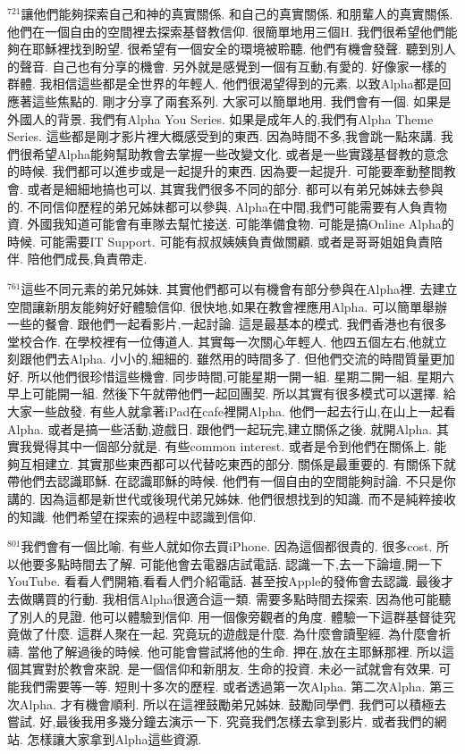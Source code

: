 \documentclass{book}
\begin{document}
$^{721}$讓他們能夠探索自己和神的真實關係.
和自己的真實關係.
和朋輩人的真實關係.
他們在一個自由的空間裡去探索基督教信仰.
很簡單地用三個H.
我們很希望他們能夠在耶穌裡找到盼望.
很希望有一個安全的環境被聆聽.
他們有機會發聲.
聽到別人的聲音.
自己也有分享的機會.
另外就是感覺到一個有互動,有愛的.
好像家一樣的群體.
我相信這些都是全世界的年輕人.
他們很渴望得到的元素.
以致Alpha都是回應著這些焦點的.
剛才分享了兩套系列.
大家可以簡單地用.
我們會有一個.
如果是外國人的背景.
我們有Alpha You Series.
如果是成年人的,我們有Alpha Theme Series.
這些都是剛才影片裡大概感受到的東西.
因為時間不多,我會跳一點來講.
我們很希望Alpha能夠幫助教會去掌握一些改變文化.
或者是一些實踐基督教的意念的時候.
我們都可以進步或是一起提升的東西.
因為要一起提升.
可能要牽動整間教會.
或者是細細地搞也可以.
其實我們很多不同的部分.
都可以有弟兄姊妹去參與的.
不同信仰歷程的弟兄姊妹都可以參與.
Alpha在中間,我們可能需要有人負責物資.
外國我知道可能會有車隊去幫忙接送.
可能準備食物.
可能是搞Online Alpha的時候.
可能需要IT Support.
可能有叔叔姨姨負責做關顧.
或者是哥哥姐姐負責陪伴.
陪他們成長,負責帶走.

$^{761}$這些不同元素的弟兄姊妹.
其實他們都可以有機會有部分參與在Alpha裡.
去建立空間讓新朋友能夠好好體驗信仰.
很快地,如果在教會裡應用Alpha.
可以簡單舉辦一些的餐會.
跟他們一起看影片,一起討論.
這是最基本的模式.
我們香港也有很多堂校合作.
在學校裡有一位傳道人.
其實每一次關心年輕人.
他四五個左右,他就立刻跟他們去Alpha.
小小的,細細的.
雖然用的時間多了.
但他們交流的時間質量更加好.
所以他們很珍惜這些機會.
同步時間,可能星期一開一組.
星期二開一組.
星期六早上可能開一組.
然後下午就帶他們一起回團契.
所以其實有很多模式可以選擇.
給大家一些啟發.
有些人就拿著iPad在cafe裡開Alpha.
他們一起去行山,在山上一起看Alpha.
或者是搞一些活動,遊戲日.
跟他們一起玩完,建立關係之後.
就開Alpha.
其實我覺得其中一個部分就是.
有些common interest.
或者是令到他們在關係上.
能夠互相建立.
其實那些東西都可以代替吃東西的部分.
關係是最重要的.
有關係下就帶他們去認識耶穌.
在認識耶穌的時候.
他們有一個自由的空間能夠討論.
不只是你講的.
因為這都是新世代或後現代弟兄姊妹.
他們很想找到的知識.
而不是純粹接收的知識.
他們希望在探索的過程中認識到信仰.

$^{801}$我們會有一個比喻.
有些人就如你去買iPhone.
因為這個都很貴的.
很多cost.
所以他要多點時間去了解.
可能他會去電器店試電話.
認識一下,去一下論壇,開一下YouTube.
看看人們開箱,看看人們介紹電話.
甚至按Apple的發佈會去認識.
最後才去做購買的行動.
我相信Alpha很適合這一類.
需要多點時間去探索.
因為他可能聽了別人的見證.
他可以體驗到信仰.
用一個像旁觀者的角度.
體驗一下這群基督徒究竟做了什麼.
這群人聚在一起.
究竟玩的遊戲是什麼.
為什麼會讀聖經.
為什麼會祈禱.
當他了解過後的時候.
他可能會嘗試將他的生命.
押在,放在主耶穌那裡.
所以這個其實對於教會來說.
是一個信仰和新朋友.
生命的投資.
未必一試就會有效果.
可能我們需要等一等.
短則十多次的歷程.
或者透過第一次Alpha.
第二次Alpha.
第三次Alpha.
才有機會順利.
所以在這裡鼓勵弟兄姊妹.
鼓勵同學們.
我們可以積極去嘗試.
好,最後我用多幾分鐘去演示一下.
究竟我們怎樣去拿到影片.
或者我們的網站.
怎樣讓大家拿到Alpha這些資源.
\end{document}
